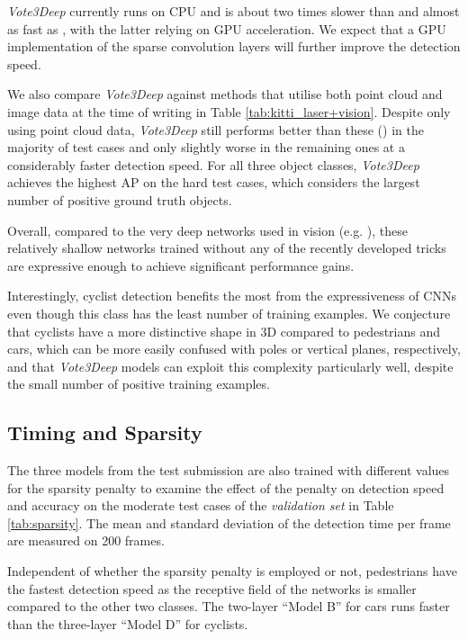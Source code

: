 \documentclass[letterpaper, 10 pt, conference]{tex_style/ieeeconf}
\begin{document}
\emph{Vote3Deep} currently runs on CPU and is about two times slower than \cite{wang2015voting} and almost as fast as \cite{livehicle}, with the latter relying on GPU acceleration.
We expect that a GPU implementation of the sparse convolution layers will further improve the detection speed.

We also compare \emph{Vote3Deep} against methods that utilise both point cloud and image data at the time of writing in Table \ref{tab:kitti_laser+vision}.
Despite only using point cloud data, \emph{Vote3Deep} still performs better than these (\cite{gonzalez2015multiview,premebida2014pedestrian}) in the majority of test cases and only slightly worse in the remaining ones at a considerably faster detection speed.
For all three object classes, \emph{Vote3Deep} achieves the highest AP on the hard test cases, which considers the largest number of positive ground truth objects.

Overall, compared to the very deep networks used in vision (e.g. \cite{simonyan2014very, szegedy2015going, he2015deep}), these relatively shallow networks trained without any of the recently developed tricks are expressive enough to achieve significant performance gains.

Interestingly, cyclist detection benefits the most from the expressiveness of CNNs even though this class has the least number of training examples.
We conjecture that cyclists have a more distinctive shape in 3D compared to pedestrians and cars, which can be more easily confused with poles or vertical planes, respectively, and that \emph{Vote3Deep} models can exploit this complexity particularly well, despite the small number of positive training examples.

\subsection{Timing and Sparsity}
\label{sec:timing}

The three models from the test submission are also trained with different values for the  sparsity penalty to examine the effect of the penalty on detection speed and accuracy on the moderate test cases of the \emph{validation set} in Table \ref{tab:sparsity}.
The mean and standard deviation of the detection time per frame are measured on 200 frames.

Independent of whether the sparsity penalty is employed or not, pedestrians have the fastest detection speed as the receptive field of the networks is smaller compared to the other two classes.
The two-layer ``Model B'' for cars runs faster than the three-layer ``Model D'' for cyclists.
\end{document}
